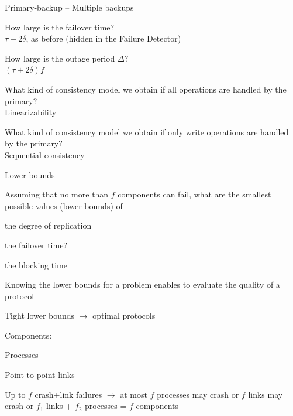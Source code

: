 \begin{frame}{Primary-backup -- Multiple backups}
	
\BIL
\item How large is the failover time?\\
  \pause \alert{$\tau + 2\delta$}, as before (hidden in the Failure Detector)
\item How large is the outage period $\Delta$?\\
  \pause \alert{$(\tau + 2\delta)f$}
\item What kind of consistency model we obtain if all operations are
  handled by the primary?\\
  \pause \alert{Linearizability}
\item What kind of consistency model we obtain if only write operations
  are handled by the primary?\\
  \pause \alert{Sequential consistency}
\EI	
	
\end{frame}

\begin{frame}{Lower bounds}

\BIL
\item Assuming that no more than $f$ \alert{components} can fail, what are the 
  smallest possible values (\alert{lower bounds}) of 
  \BI
  \item the degree of replication
  \item the failover time?
  \item the blocking time 
  \EI
\item Knowing the lower bounds for a problem enables to evaluate the quality of a protocol
\item Tight lower bounds $\rightarrow$ optimal protocols
\item Components: 
	\BI
	\item Processes
	\item Point-to-point links
\item Up to $f$ crash+link failures $\rightarrow$ at most $f$ processes may
crash or $f$ links may crash or $f_1$ links + $f_2$ processes = $f$ components
	\EI
\EI
\end{frame}


